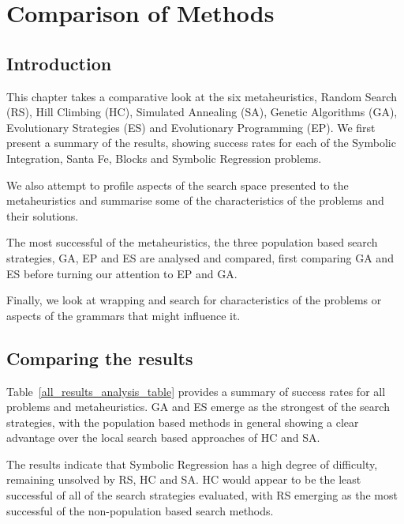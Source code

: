 \chapter{Comparison of Methods}
\section{Introduction}
This chapter takes a comparative look at the six metaheuristics, Random Search (RS), Hill Climbing (HC), Simulated Annealing (SA), Genetic Algorithms (GA), Evolutionary Strategies (ES) and Evolutionary Programming (EP).
We first present a summary of the results, showing success rates for each of the Symbolic Integration, Santa Fe, Blocks and  Symbolic Regression problems.

We also attempt to profile aspects of the search space presented to the metaheuristics and summarise some of the characteristics of the problems and their solutions.

The most successful of the metaheuristics, the three population based search strategies, GA, EP and ES  are analysed and compared, first comparing GA and ES before turning our attention to EP and GA.

Finally, we look at wrapping and search for characteristics of the problems or aspects of the grammars that might influence it.

\section{Comparing the results}
Table~\ref{all_results_analysis_table} provides a summary of success rates for all problems and metaheuristics. GA and ES emerge as the strongest of the search strategies, with the population based methods in general showing a clear advantage over the local search based approaches of HC and SA.

 The results indicate that Symbolic Regression has a high degree of difficulty, remaining unsolved by RS, HC and SA. 
HC would appear to be the least successful of all of the search strategies evaluated, with RS emerging as the most successful of the non-population based search methods.



